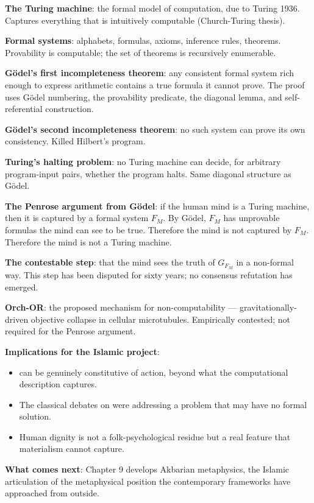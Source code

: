 \begin{summarybox}
\textbf{The Turing machine}: the formal model of computation, due
to Turing 1936. Captures everything that is intuitively computable
(Church-Turing thesis).

\textbf{Formal systems}: alphabets, formulas, axioms, inference
rules, theorems. Provability is computable; the set of theorems is
recursively enumerable.

\textbf{G\"odel's first incompleteness theorem}: any consistent
formal system rich enough to express arithmetic contains a true
formula it cannot prove. The proof uses G\"odel numbering, the
provability predicate, the diagonal lemma, and self-referential
construction.

\textbf{G\"odel's second incompleteness theorem}: no such system
can prove its own consistency. Killed Hilbert's program.

\textbf{Turing's halting problem}: no Turing machine can decide,
for arbitrary program-input pairs, whether the program halts. Same
diagonal structure as G\"odel.

\textbf{The Penrose argument from G\"odel}: if the human mind is a
Turing machine, then it is captured by a formal system $F_M$. By
G\"odel, $F_M$ has unprovable formulas the mind can see to be true.
Therefore the mind is not captured by $F_M$. Therefore the mind is
not a Turing machine.

\textbf{The contestable step}: that the mind sees the truth of
$G_{F_M}$ in a non-formal way. This step has been disputed for sixty
years; no consensus refutation has emerged.

\textbf{Orch-OR}: the proposed mechanism for non-computability ---
gravitationally-driven objective collapse in cellular microtubules.
Empirically contested; not required for the Penrose argument.

\textbf{Implications for the Islamic project}:
\begin{itemize}[leftmargin=1.5em]
    \item {} can be genuinely constitutive of action,
    beyond what the computational description captures.
    \item The classical  debates on  were
    addressing a problem that may have no formal solution.
    \item Human dignity is not a folk-psychological residue but a
    real feature that materialism cannot capture.
\end{itemize}

\textbf{What comes next}: Chapter 9 develops Akbarian metaphysics,
the Islamic articulation of the metaphysical position the
contemporary frameworks have approached from outside.
\end{summarybox}

\cleardoublepage
